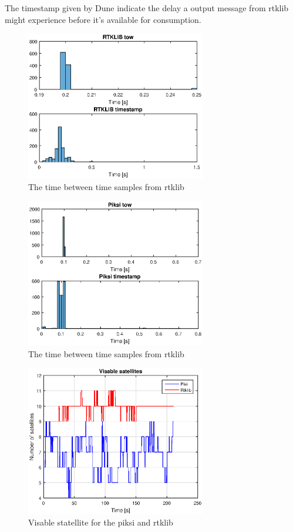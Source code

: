 The timestamp given by Dune indicate the delay a output message from rtklib might experience before it's available for consumption.
\begin{figure}[H]
	\centering
		\includegraphics[width=0.7\textwidth]{figs/plots/rtktime.eps}
		\caption{The time between time samples from rtklib}
		\label{figure:timeRTKwalk1}
\end{figure}
\begin{figure}[H]
	\centering
		\includegraphics[width=0.7\textwidth]{figs/plots/piksitime.eps}
		\caption{The time between time samples from rtklib}
		\label{figure:timePiksiWalk1}
\end{figure}
\begin{figure}[H]
	\centering
		\includegraphics[width=0.7\textwidth]{figs/plots/sv.eps}
		\caption{Visable statellite for the piksi and rtklib}
		\label{figure:NumSatWalk1}
\end{figure}

